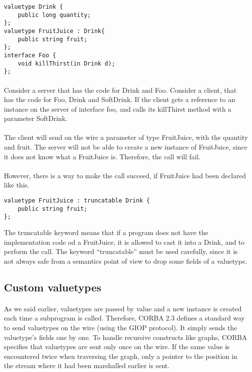 \begin{verbatim}
valuetype Drink {
	public long quantity;
};
valuetype FruitJuice : Drink{
	public string fruit;
};
interface Foo {
	void killThirst(in Drink d);
};
\end{verbatim}
\paragraph{}
Consider a server that has the code for Drink and Foo. Consider a
client, that has the code for Foo, Drink and SoftDrink. If the client
gets a reference to an instance on the server of interface foo, and
calls its killThirst method with a parameter SoftDrink.

\paragraph{}The client will send on the wire a parameter of type
FruitJuice, with the quantity and fruit. The server will not be able
to create a new instance of FruitJuice, since it does not know what a
FruitJuice is. Therefore, the call will fail.

\paragraph{}However, there is a way to make the call succeed, if
FruitJuice had been declared like this.

\begin{verbatim}
valuetype FruitJuice : truncatable Drink {
	public string fruit;
};
\end{verbatim}

The truncatable keyword means that if a program does not have the
implementation code od a FruitJuice, it is allowed to cast it into a
Drink, and to perform the call. The keyword ``truncatable'' must be
used carefully, since it is not always safe from a semantics point of
view to drop some fields of a valuetype.

\subsection{Custom valuetypes}
\paragraph{}
As we said earlier, valuetypes are passed by value and a new instance
is created each time a subprogram is called. Therefore, CORBA 2.3
defines a standard way to send valuetypes on the wire (using the GIOP
protocol). It simply sends the valuetype's fields one by one. To
handle recursive constructs like graphs, CORBA specifies that
valuetypes are sent only once on the wire. If the same value is
encountered twice when traversing the graph, only a pointer to the
position in the stream where it had been marshalled earlier is sent.

